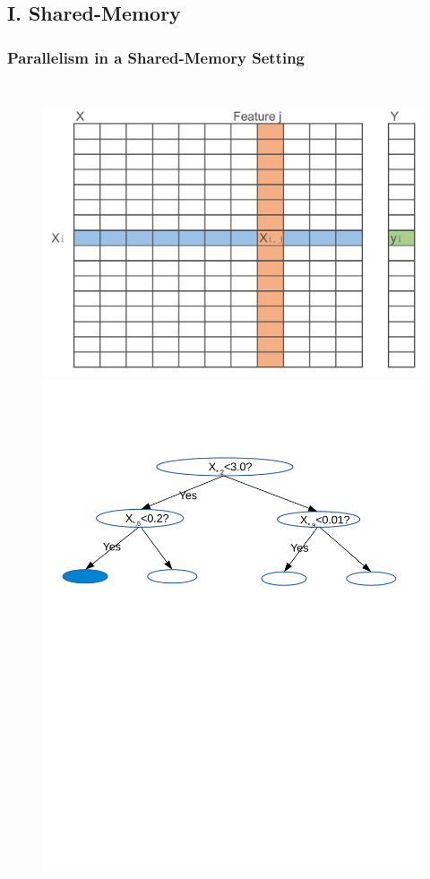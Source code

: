 \documentclass{beamer}
\begin{document}
\subsection{I. Shared-Memory} 
\begin{frame}
	\frametitle{Parallelism in a Shared-Memory Setting}
	\begin{columns}[c] %
		\begin{figure}
			\includegraphics[width=1\linewidth]{figs/dataset.jpg} \\
			\includegraphics[width=1\linewidth]{figs/dtree}
		\end{figure}
		

\end{columns}
\end{frame}
\end{document}
